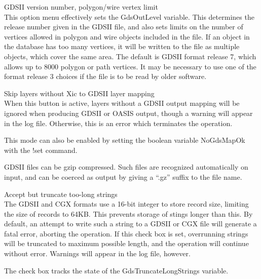\begin{description}
\item{\cb GDSII version number, polygon/wire vertex limit}\\
This option menu effectively sets the {\et GdsOutLevel} variable. 
This determines the release number given in the GDSII file, and also
sets limits on the number of vertices allowed in polygon and wire
objects included in the file.  If an object in the database has too
many vertices, it will be written to the file as multiple objects,
which cover the same area.  The default is GDSII format release 7,
which allows up to 8000 polygon or path vertices.  It may be necessary
to use one of the format release 3 choices if the file is to be read
by older software.

\item{\cb Skip layers without Xic to GDSII layer mapping}\\
When this button is active, layers without a GDSII output mapping will
be ignored when producing GDSII or OASIS output, though a warning will
appear in the log file.  Otherwise, this is an error which terminates
the operation.

This mode can also be enabled by setting the boolean variable {\et
NoGdsMapOk} with the {\cb !set} command.

GDSII files can be gzip compressed.  Such files are recognized
automatically on input, and can be coerced as output by giving a
``{\vt .gz}'' suffix to the file name.

\item{\cb Accept but truncate too-long strings}\\
The GDSII and CGX formats use a 16-bit integer to store record size,
limiting the size of records to 64KB.  This prevents storage of stings
longer than this.  By default, an attempt to write such a string to a
GDSII or CGX file will generate a fatal error, aborting the operation. 
If this check box is set, overrunning strings will be truncated to
maximum possible length, and the operation will continue without
error.  Warnings will appear in the log file, however.

The check box tracks the state of the {\cb GdsTruncateLongStrings}
variable.


\end{description}
